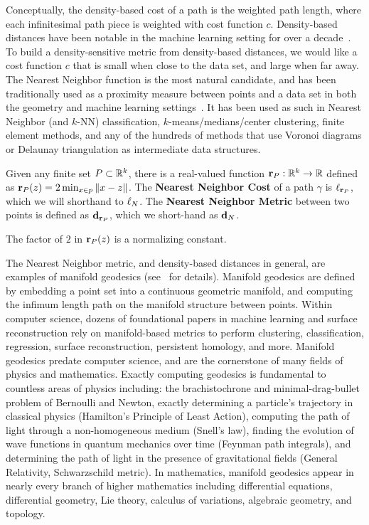 Conceptually, the density-based cost of a path is the weighted path length,
where each infinitesimal path piece is weighted with cost function $c$.
Density-based distances have been notable in the machine learning setting
for over a decade~\cite{}. To build a density-sensitive metric from density-based
distances, we would like a cost function $c$ that is small when close to
the data set, and large when far away. The Nearest Neighbor function is the
most natural candidate, and has been traditionally used as a proximity
measure between points and a data set in both the geometry and machine
learning settings~\cite{}. It has been used as such in Nearest Neighbor
(and $k$-NN) classification, $k$-means/medians/center clustering, finite
element methods, and any of the hundreds of methods that use Voronoi
diagrams or Delaunay triangulation as intermediate data structures.

\begin{definition} Given any finite set $P\subset \mathbb{R}^k$, there is a
real-valued function $\mathbf{r}_P: \mathbb{R}^k\to \mathbb{R}$ defined as
$\mathbf{r}_P(z) = 2\min_{x\in p} \|x-z\|$.  The \textbf{Nearest Neighbor Cost}
of a path $\gamma$ is $\ell_{\mathbf{r}_P}$, which we will shorthand to
$\ell_N$.  
The \textbf{Nearest Neighbor Metric} between two points is
defined as $\mathbf{d}_{\mathbf{r}_P}$, which we short-hand as $\mathbf{d}_N$.

The factor of $2$ in $\mathbf{r}_P(z)$ is a
normalizing constant.
\end{definition}
The Nearest Neighbor metric, and density-based distances in general, are
examples of manifold geodesics (see~\cite{} for details). Manifold
geodesics are defined by embedding a point set into a continuous geometric
manifold, and computing the infimum length path on the manifold structure
between points.  Within computer science, dozens of foundational papers in
machine learning and surface reconstruction rely on manifold-based metrics
to perform clustering, classification, regression, surface reconstruction,
persistent homology, and more.  Manifold geodesics
predate computer science, and are the cornerstone of many fields of
physics and mathematics. Exactly computing geodesics is fundamental
to countless areas of physics including: the brachistochrone and
minimal-drag-bullet problem of Bernoulli and Newton, exactly determining a
particle's trajectory in classical physics (Hamilton's Principle of Least
Action), computing the path of light through a non-homogeneous medium
(Snell's law), finding the evolution of wave functions in quantum mechanics
over time (Feynman path integrals), and determining the path of light in
the presence of gravitational fields (General Relativity, Schwarzschild
metric). In mathematics, manifold geodesics appear in nearly every branch
of higher mathematics including differential equations, differential
geometry, Lie theory, calculus of variations, algebraic geometry, and
topology.  

